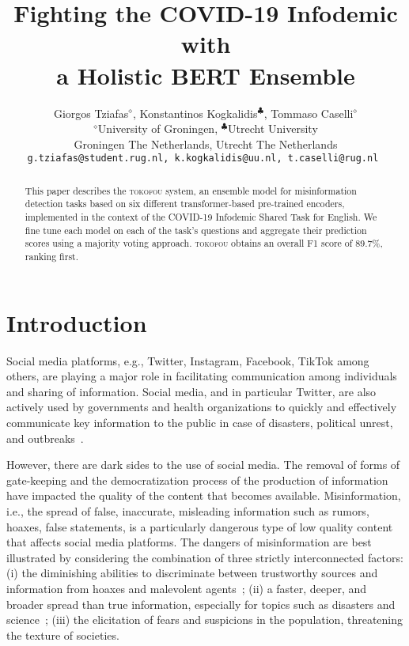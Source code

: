 \documentclass[11pt,a4paper]{article}
\title{Fighting the COVID-19 Infodemic with\\ a Holistic BERT Ensemble}
\author{Giorgos Tziafas$^{\diamond}$, Konstantinos Kogkalidis$^{\clubsuit}$, 
 Tommaso Caselli$^{\diamond}$  \\
$^{\diamond}$University of Groningen, $^{\clubsuit}$Utrecht University\\
         Groningen The Netherlands, Utrecht The Netherlands\\
\tt g.tziafas@student.rug.nl,
 k.kogkalidis@uu.nl,
 t.caselli@rug.nl
}
\begin{document}
\maketitle

\begin{abstract}
This paper describes the \textsc{tokofou} system, an ensemble model for misinformation detection tasks based on six different transformer-based pre-trained encoders, implemented in the context of the COVID-19 Infodemic Shared Task for English. We fine tune each model on each of the task's questions and aggregate their prediction scores using a majority voting approach. \textsc{tokofou} obtains an overall F1 score of 89.7\%, ranking first. 

\end{abstract}

\section{Introduction}
Social media platforms, e.g., Twitter, Instagram, Facebook, TikTok among others, are playing a major role in facilitating communication among individuals and sharing of information. Social media, and in particular Twitter, are also actively used by governments and health organizations to quickly and effectively communicate key information to the public in case of disasters, political unrest, and outbreaks~\cite{househ2016communicating,stefanidis2017zika,lalone2017embracing,daughton2019identifying,rogers-etal-2019-calls}.

However, there are dark sides to the use of social media. The removal of forms of gate-keeping and the democratization process of the production of information have impacted the quality of the content that becomes available. Misinformation, i.e., the spread of false, inaccurate, misleading information such as rumors, hoaxes, false statements, is a particularly dangerous type of low quality content that affects social media platforms. The dangers of misinformation are best illustrated by considering the combination of three strictly interconnected factors: (i) the diminishing abilities to discriminate between trustworthy sources and information from hoaxes and malevolent agents~\cite{hargittai2010trust}; (ii) a faster, deeper, and broader spread than true information, especially for topics such as disasters and science~\cite{vosoughi2018spread}; (iii) the elicitation of fears and suspicions in the population, threatening the texture of societies. 
\end{document}
